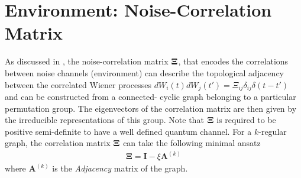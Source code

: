 \documentclass[aps,pra,reprint,amsmath,amssymb]{revtex4-2}
\begin{document}
\section*{Environment: Noise-Correlation Matrix}
As discussed in \cite{Bittner:2025aa}, the noise-correlation matrix ${\bf \Xi}$, that encodes the correlations between noise channels (environment) can describe the topological adjacency between the correlated Wiener processes $dW_i(t)dW_j(t') = \Xi_{ij}\delta_{ij}\delta(t-t')$ and can be constructed from a connected- cyclic graph belonging to a particular permutation group. The eigenvectors of the correlation matrix are then given by the irreducible representations of this group. Note that ${\bf \Xi}$ is required to be positive semi-definite to have a well defined quantum channel. For a $k$-regular graph, the correlation matrix ${\bf \Xi}$ can take the following minimal ansatz
\begin{align}
    \mathbf{\Xi}=\mathbf{I}-\xi \mathbf{A}^{(k)} 
\end{align}
where $\mathbf{A}^{(k)}$ is the {\it Adjacency} matrix of the graph. 
\end{document}
